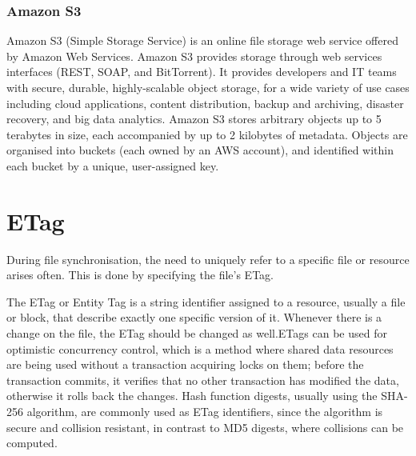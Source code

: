     \subsubsection{Amazon S3}
      Amazon S3\cite{amazon-s3} (Simple Storage Service) is an online file storage web service offered by Amazon Web Services. Amazon S3 provides storage through web services interfaces (REST, SOAP, and BitTorrent). It provides developers and IT teams with secure, durable, highly-scalable object storage, for a wide variety of use cases including cloud applications, content distribution, backup and archiving, disaster recovery, and big data analytics. Amazon S3 stores arbitrary objects up to 5 terabytes in size, each accompanied by up to 2 kilobytes of metadata. Objects are organised into buckets (each owned by an AWS account), and identified within each bucket by a unique, user-assigned key.


\section{ETag}
  During file synchronisation, the need to uniquely refer to a specific file or resource arises often. This is done by specifying the file's ETag.

  The ETag or Entity Tag is a string identifier assigned to a resource, usually a file or block, that describe exactly one specific version of it. Whenever there is a change on the file, the ETag should be changed as well.ETags can be used for optimistic concurrency control\cite{concurrency-control}, which is a method where shared data resources are being used without a transaction acquiring locks on them; before the transaction commits, it verifies that no other transaction has modified the data, otherwise it rolls back the changes. Hash function digests, usually using the SHA-256 algorithm, are commonly used as ETag identifiers, since the algorithm is secure and collision resistant, in contrast to MD5 digests, where collisions can be computed.

